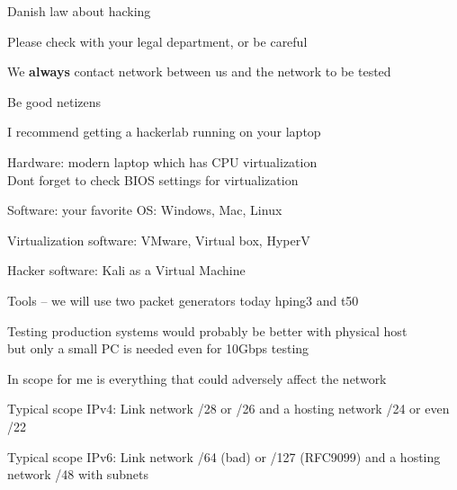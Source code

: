 \documentclass[Screen16to9,17pt]{foils}
\begin{document}
\begin{list2}
\item Danish law about hacking
\item Please check with your legal department, or be careful
\item We {\bf always} contact network between us and the network to be tested
\item Be good netizens
\end{list2}



\begin{list2}
\item I recommend getting a hackerlab running on your laptop
\item Hardware: modern laptop which has CPU virtualization\\
Dont forget to check BIOS settings for virtualization
\item Software: your favorite OS: Windows, Mac, Linux
\item Virtualization software: VMware, Virtual box, HyperV
\item Hacker software: Kali as a Virtual Machine 
\item Tools -- we will use two packet generators today hping3 and t50
\item Testing production systems would probably be better with physical host\\
but only a small PC is needed even for 10Gbps testing
\end{list2}




\begin{list2}
\item In scope for me is everything that could adversely affect the network
\item Typical scope IPv4: Link network /28 or /26 and a hosting network /24 or even /22
\item Typical scope IPv6: Link network /64 (bad) or /127 (RFC9099) and a hosting network /48 with subnets
\end{list2}
\end{document}
